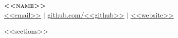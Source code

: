 \documentclass[letterpaper,11pt]{article}
\begin{document}
\begin{center}
    \textbf{\Huge \scshape <<name>>} \\ \vspace{1pt}
    \href{mailto:<<email>>}{\underline{<<email>>}} $|$
    \href{https://github.com/<<github>>}{\underline{github.com/<<github>>}} $|$
    \href{https://<<website>>}{\underline{<<website>>}}
\end{center}




<<sections>>

\end{document}
